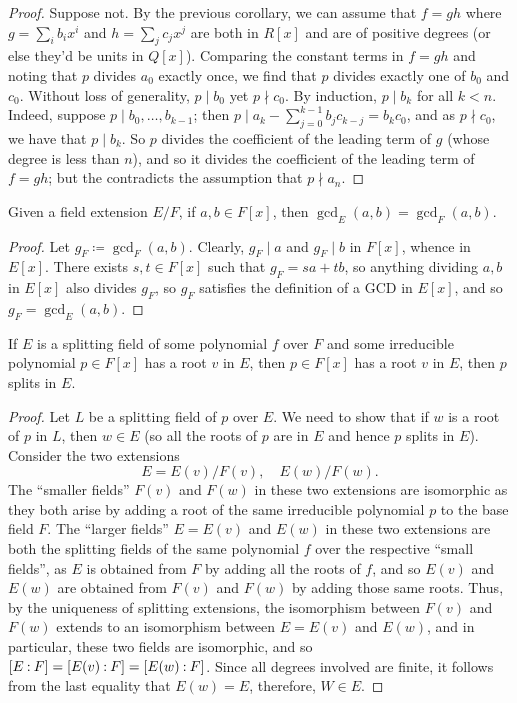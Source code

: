 \begin{proof}
    Suppose not. By the previous corollary, we can assume that $f = gh$ where $g = \sum_i b_i x^i$ and $h = \sum_j c_j x^j$ are both in $R[x]$ and are of positive degrees (or else they'd be units in $Q[x]$). Comparing the constant terms in $f = gh$ and noting that $p$ divides $a_0$ exactly once, we find that $p$ divides exactly one of $b_0$ and $c_0$. Without loss of generality, $p \mid b_0$ yet $p \nmid c_0$. By induction, $p \mid b_k$ for all $k < n$. Indeed, suppose $p \mid b_0,\dots, b_{k-1}$; then $p \mid a_k - \sum_{j=0}^{k-1} b_j c_{k-j} = b_k c_0$, and as $p \nmid c_0$, we have that $p \mid b_k$. So $p$ divides the coefficient of the leading term of $g$ (whose degree is less than $n$), and so it divides the coefficient of the leading term of $f = gh$; but the contradicts the assumption that $p \nmid a_n$.
\end{proof}
\begin{proposition}
    Given a field extension $E/F$, if $a, b \in F[x]$, then $\gcd_E(a, b) = \gcd_F(a, b)$.
\end{proposition}
\begin{proof}
    Let $g_F \coloneq \gcd_F(a, b)$. Clearly, $g_F \mid a$ and $g_F \mid b$ in $F[x]$, whence in $E[x]$. There exists $s, t \in F[x]$ such that $g_F = sa + tb$, so anything dividing $a, b$ in $E[x]$ also divides $g_F$, so $g_F$ satisfies the definition of a GCD in $E[x]$, and so $g_F = \gcd_E(a, b)$.
\end{proof}
\begin{lemma}
    If $E$ is a splitting field of some polynomial $f$ over $F$ and some irreducible polynomial $p \in F[x]$ has a root $v$ in $E$, then $p \in F[x]$ has a root $v$ in $E$, then $p$ splits in $E$.
\end{lemma}
\begin{proof}
    Let $L$ be a splitting field of $p$ over $E$. We need to show that if $w$ is a root of $p$ in $L$, then $w \in E$ (so all the roots of $p$ are in $E$ and hence $p$ splits in $E$). Consider the two extensions
    \[ E = E(v)/F(v), \quad E(w)/F(w). \]
    The ``smaller fields'' $F(v)$ and $F(w)$ in these two extensions are isomorphic as they both arise by adding a root of the same irreducible polynomial $p$ to the base field $F$. The ``larger fields'' $E = E(v)$ and $E(w)$ in these two extensions are both the splitting fields of the same polynomial $f$ over the respective ``small fields'', as $E$ is obtained from $F$ by adding all the roots of $f$, and so $E(v)$ and $E(w)$ are obtained from $F(v)$ and $F(w)$ by adding those same roots. Thus, by the uniqueness of splitting extensions, the isomorphism between $F(v)$ and $F(w)$ extends to an isomorphism between $E = E(v)$ and $E(w)$, and in particular, these two fields are isomorphic, and so $\coor{E:F} = \coor{E(v):F} = \coor{E(w):F}$. Since all degrees involved are finite, it follows from the last equality that $E(w) = E$, therefore, $W \in E$.
\end{proof}
